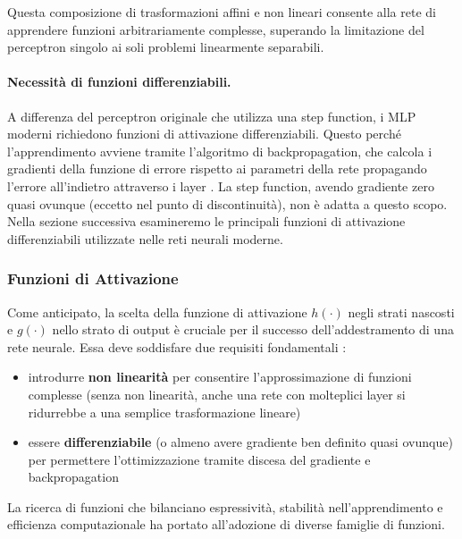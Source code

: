 Questa composizione di trasformazioni affini e non lineari consente alla rete di apprendere funzioni arbitrariamente complesse, superando la limitazione del perceptron singolo ai soli problemi linearmente separabili.


\paragraph{Necessità di funzioni differenziabili.} A differenza del perceptron originale che utilizza una step function, i MLP moderni richiedono funzioni di attivazione differenziabili. Questo perché l'apprendimento avviene tramite l'algoritmo di backpropagation, che calcola i gradienti della funzione di errore rispetto ai parametri della rete propagando l'errore all'indietro attraverso i layer \cite{rumelhart1986learning}. La step function, avendo gradiente zero quasi ovunque (eccetto nel punto di discontinuità), non è adatta a questo scopo. Nella sezione successiva esamineremo le principali funzioni di attivazione differenziabili utilizzate nelle reti neurali moderne.

\subsubsection{Funzioni di Attivazione}
\label{sec:funzioni_attivazione}

Come anticipato, la scelta della funzione di attivazione $h(\cdot)$ negli strati nascosti e $g(\cdot)$ nello strato di output è cruciale per il successo dell'addestramento di una rete neurale. Essa deve soddisfare due requisiti fondamentali \cite{goodfellow2016deep}: 

\begin{itemize}
    \item introdurre \textbf{non linearità} per consentire l'approssimazione di funzioni complesse (senza non linearità, anche una rete con molteplici layer si ri\-dur\-reb\-be a una semplice trasformazione lineare)
    \item essere \textbf{differenziabile} (o almeno avere gradiente ben definito quasi o\-vun\-que) per permettere l'ottimizzazione tramite discesa del gradiente e back\-pro\-pa\-ga\-tion
\end{itemize}

La ricerca di funzioni che bilanciano espressività, stabilità nell'apprendimento e efficienza computazionale ha portato all'adozione di diverse famiglie di fun\-zio\-ni.



